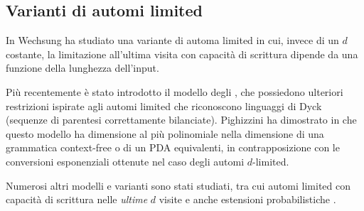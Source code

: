 \subsection{Varianti di automi limited}
In \cite{Wechsung:79:complexities} Wechsung ha studiato una variante di automa limited in cui, invece di un $d$ costante, la limitazione all'ultima visita con capacità di scrittura dipende da una funzione della lunghezza dell'input.

Più recentemente è stato introdotto il modello degli , che possiedono ulteriori restrizioni ispirate agli automi limited che riconoscono linguaggi di Dyck (sequenze di parentesi correttamente bilanciate). Pighizzini ha dimostrato in \cite{Pighizzini:16:stronglylimited} che questo modello ha dimensione al più polinomiale nella dimensione di una grammatica context-free o di un PDA equivalenti, in contrapposizione con le conversioni esponenziali ottenute nel caso degli automi $d$-limited.

Numerosi altri modelli e varianti sono stati studiati, tra cui automi limited con capacità di scrittura nelle \emph{ultime} $d$ visite \cite{Wechsung:79:complexities} e anche estensioni probabilistiche \cite{Yamakami:19:limitedmodels}.
